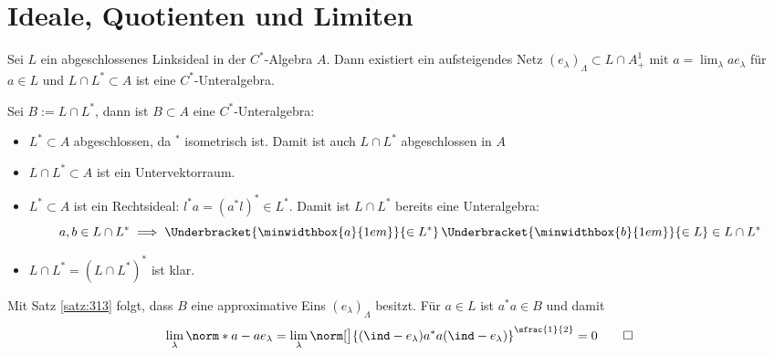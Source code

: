 \section{Ideale, Quotienten und Limiten} %
\label{sec:4}

\begin{proposition}[{name=[aus abgeschlossenem Ideal eine $C^*$-Unteralgebra bauen]},label=prop:41]
	Sei $L$ ein abgeschlossenes Linksideal in der $C^*$-Algebra $A$.
	Dann existiert ein aufsteigendes Netz $(e_\lambda)_\Lambda \subset L \cap A_+^1$ mit $a =\lim_\lambda a e_\lambda$ für $a \in L$ und $L \cap L^* \subset A$ ist eine $C^*$-Unteralgebra.
\end{proposition}
\begin{beweis}
	Sei $B := L \cap L^*$, dann ist $B \subset A$ eine $C^*$-Unteralgebra:
	\begin{itemize}[itemsep=0pt]
		\item $L^* \subset A$ abgeschlossen, da $^*$ isometrisch ist. Damit ist auch $L \cap L^*$ abgeschlossen in $A$
		\item $L \cap L^* \subset A$ ist ein Untervektorraum.
		\item $L^* \subset A$ ist ein Rechtsideal: $l^* a = (a^*l)^* \in L^*$. Damit ist $L \cap L^*$ bereits eine Unteralgebra: 
		\[
			a,b \in L \cap L^* \implies \Underbracket{\minwidthbox{a}{1em}}{\in L^*} \, \Underbracket{\minwidthbox{b}{1em}}{\in L} \in L \cap L^*
		\]
		\item $L \cap L^* = (L \cap L^*)^*$ ist klar.
	\end{itemize}
	Mit Satz \autoref{satz:313} folgt, dass $B$ eine approximative Eins $(e_\lambda)_\Lambda$ besitzt. 
	Für $a \in L$ ist $a^*a \in B$ und damit 
	\[
		\lim_\lambda \norm*{a-a e_\lambda}  = \lim_\lambda \norm[\big]{(\ind-e_\lambda)a^* a(\ind-e_\lambda)}^{\sfrac{1}{2}} =0 \qedhere
	\]
\end{beweis}

